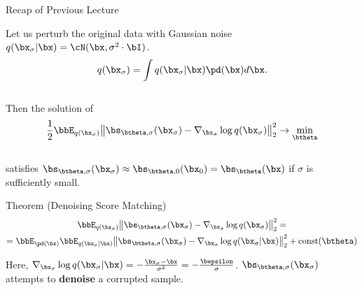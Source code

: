 \documentclass{beamer}
\begin{document}
\begin{frame}
\titlepage
\end{frame}
\begin{frame}{Recap of Previous Lecture}

    Let us perturb the original data with Gaussian noise $q(\bx_{\sigma} | \bx) = \cN(\bx, \sigma^2 \cdot \bI)$.
    \vspace{-0.3cm}
    \[
        q(\bx_{\sigma}) = \int q(\bx_{\sigma} | \bx) \pd(\bx) d\bx.
    \]
    \vspace{-0.6cm} \\
    Then the solution of 
    \vspace{-0.2cm}
    \[
        \frac{1}{2} \bbE_{q(\bx_{\sigma})}\bigl\| \bs_{\btheta, \sigma}(\bx_{\sigma}) - \nabla_{\bx_{\sigma}} \log q(\bx_{\sigma}) \bigr\|^2_2 \rightarrow \min_{\btheta}
    \]
    \vspace{-0.5cm} \\
    satisfies $\bs_{\btheta, \sigma}(\bx_{\sigma}) \approx \bs_{\btheta, 0}(\bx_0) = \bs_{\btheta}(\bx)$ if $\sigma$ is sufficiently small.
    \begin{block}{Theorem (Denoising Score Matching)}
        \vspace{-0.8cm}
        \begin{multline*}
            \bbE_{q(\bx_{\sigma})}\bigl\| \bs_{\btheta, \sigma}(\bx_{\sigma}) - \nabla_{\bx_{\sigma}} \log q(\bx_{\sigma}) \bigr\|^2_2 = \\ = \bbE_{\pd(\bx)} \bbE_{q(\bx_{\sigma} | \bx)}\bigl\| \bs_{\btheta, \sigma}(\bx_{\sigma}) - \nabla_{\bx_{\sigma}} \log q(\bx_{\sigma} | \bx) \bigr\|^2_2 + \text{const}(\btheta)
        \end{multline*}
        \vspace{-0.7cm}
    \end{block}
    Here, $\nabla_{\bx_{\sigma}} \log q(\bx_{\sigma} | \bx) = - \frac{\bx_{\sigma} - \bx}{\sigma^2} = - \frac{\bepsilon}{\sigma}$. $\bs_{\btheta, \sigma}(\bx_{\sigma})$ attempts to \textbf{denoise} a corrupted sample.
\end{frame}
\end{document}
